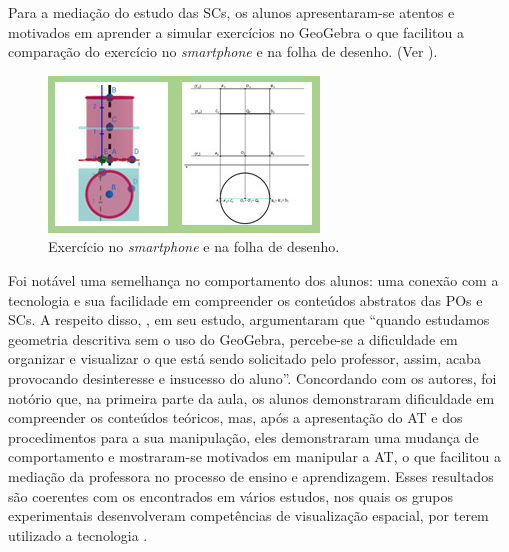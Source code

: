 Para a mediação do estudo das SCs, os alunos apresentaram-se atentos e
motivados em aprender a simular exercícios no GeoGebra o que facilitou a
comparação do exercício no \textit{smartphone} e na folha de desenho. (Ver ).

\begin{figure}[htpb]
\centering
\begin{minipage}{.5\textwidth}
\includegraphics[width=\textwidth]{figures/figure08.jpg}
\caption{Exercício no \textit{smartphone} e na folha de desenho.}
\label{fig-08}
\end{minipage}
\end{figure}


Foi notável uma semelhança no comportamento dos alunos: uma conexão com
a tecnologia e sua facilidade em compreender os conteúdos abstratos das
POs e SCs. A respeito disso, \textcite[p. 145]{jesus2019}, em seu estudo,
argumentaram que \enquote{quando estudamos geometria descritiva sem o uso do
	GeoGebra, percebe-se a dificuldade em organizar e visualizar o que está
	sendo solicitado pelo professor, assim, acaba provocando desinteresse e
	insucesso do aluno}. Concordando com os autores, foi notório que, na
primeira parte da aula, os alunos demonstraram dificuldade em
compreender os conteúdos teóricos, mas, após a apresentação do AT e dos
procedimentos para a sua manipulação, eles demonstraram uma mudança de
comportamento e mostraram-se motivados em manipular a AT, o que
facilitou a mediação da professora no processo de ensino e aprendizagem.
Esses resultados são coerentes com os encontrados em vários estudos, nos
quais os grupos experimentais desenvolveram competências de visualização
espacial, por terem utilizado a tecnologia \cite{carbonell2017,lukaszewicz2018,omar2019}.

